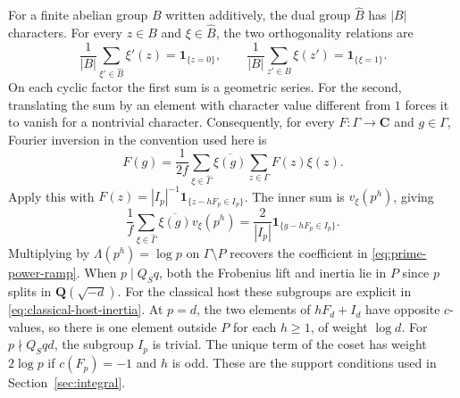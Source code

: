For a finite abelian group \(B\) written additively, the dual group
\(\widehat B\) has \(|B|\) characters. For every \(z\in B\) and
\(\xi\in\widehat B\), the two orthogonality relations are
\[
 \frac{1}{|B|}\sum_{\xi'\in\widehat B}\xi'(z)=\mathbf 1_{\{z=0\}},
 \qquad
 \frac{1}{|B|}\sum_{z'\in B}\xi(z')=\mathbf 1_{\{\xi=1\}}.
\]
On each cyclic factor the first sum is a geometric series. For the
second, translating the sum by an element with character value
different from \(1\) forces it to vanish for a nontrivial character.
Consequently, for every \(F:\Gamma\to\mathbf C\) and \(g\in\Gamma\),
Fourier inversion in the convention used here is
\[
 F(g)=\frac{1}{2f}\sum_{\xi\in\widehat\Gamma}\overline{\xi(g)}
                                \sum_{z\in\Gamma}F(z)\xi(z).
\]
\cite[Theorem~4.4, (4.12)--(4.13)]{z6montgomery-vaughan}
Apply this with \(F(z)=|I_p|^{-1}\mathbf 1_{\{z-hF_p\in I_p\}}\).
The inner sum is \(v_\xi(p^h)\), giving
\[
 \frac{1}{f}\sum_{\xi\in\widehat\Gamma}\overline{\xi(g)}v_\xi(p^h)
 =\frac{2}{|I_p|}\mathbf 1_{\{g-hF_p\in I_p\}} .
\]
Multiplying by \(\Lambda(p^h)=\log p\) on \(\Gamma\setminus P\)
recovers the coefficient in \eqref{eq:prime-power-ramp}. When
\(p\mid Q_Sq\), both the Frobenius lift and inertia lie in \(P\) since
\(p\) splits in \(\mathbf Q(\sqrt{-d})\). For the classical host these
subgroups are explicit in \eqref{eq:classical-host-inertia}. At \(p=d\),
the two elements of \(hF_d+I_d\) have opposite \(c\)-values, so there
is one element outside \(P\) for each \(h\ge1\), of weight \(\log d\).
For \(p\nmid Q_Sqd\), the subgroup \(I_p\) is trivial. The unique
term of the coset has weight \(2\log p\) if \(c(F_p)=-1\) and \(h\) is
odd. These are the support conditions used in Section~\ref{sec:integral}.

